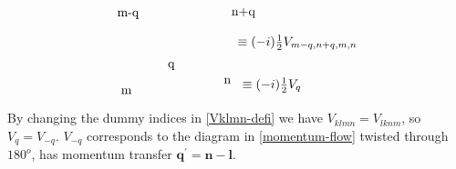 \begin{equation}
\begin{tikzpicture}[x=0.75pt,y=0.75pt,yscale=-1,xscale=1]
\draw (515.68,540.7) node [anchor=north west][inner sep=0.75pt]    {$\equiv ( -i)\frac{1}{2} V_{m-q,n+q,m,n}$};
\draw (393.75,597.3) node [anchor=north west][inner sep=0.75pt]   [align=left] {m};
\draw (389.75,515.3) node [anchor=north west][inner sep=0.75pt]   [align=left] {m-q};
\draw (442.75,569.3) node [anchor=north west][inner sep=0.75pt]   [align=left] {q};
\draw (501.28,586.21) node [anchor=north west][inner sep=0.75pt]   [align=left] {n};
\draw (509.28,512.21) node [anchor=north west][inner sep=0.75pt]   [align=left] {n+q};
\draw (520.68,585.7) node [anchor=north west][inner sep=0.75pt]    {$\equiv ( -i)\frac{1}{2} V_{q}$};


\end{tikzpicture}
\label{momentum-flow}
\end{equation}
By changing the dummy indices in \ref{Vklmn-defi} we have $V_{klmn}=V_{lknm}$, so $V_q=V_{-q}$. $V_{-q}$ corresponds to the diagram in \ref{momentum-flow} twisted through $180^o$, has momentum transfer $\mathbf{q}^{\prime}=\mathbf{n}-\mathbf{l}$.
